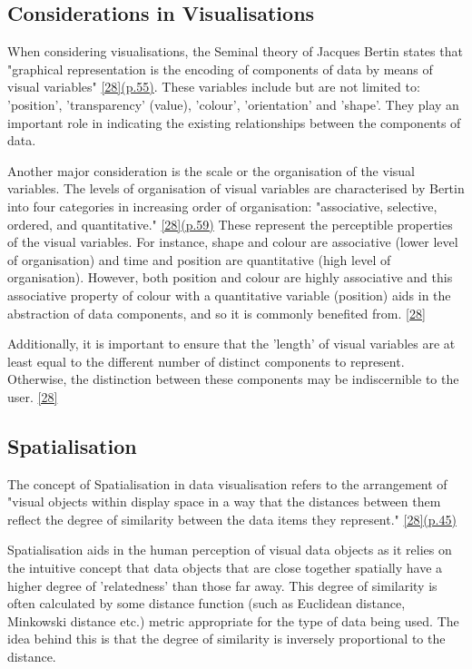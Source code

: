 \subsection{Considerations in Visualisations}
When considering visualisations, the
Seminal theory of Jacques Bertin states that "graphical representation
is the encoding of components of data by means of visual variables" \hyperlink{28}{[28](p.55)}. These variables include but are not limited to: 'position', 'transparency' (value), 'colour', 'orientation' and 'shape'. They play an important role in indicating the existing relationships between the components of data. 


Another major consideration is the scale or the organisation of the visual variables. 
The levels of organisation of visual variables are characterised by Bertin into four categories in increasing order of organisation: "associative, selective, ordered, and quantitative." \hyperlink{28}{[28](p.59)} These represent the perceptible properties of the visual variables. For instance, shape and colour are associative (lower level of organisation) and time and position are quantitative (high level of organisation). However, both position and colour are highly associative and this associative property of colour with a quantitative variable (position) aids in the abstraction of data components, and so it is commonly benefited from. \hyperlink{28}{[28]} 

Additionally, it is important to ensure that the 'length' of visual variables are at least equal to the different number of distinct components to represent. Otherwise, the distinction between these components may be indiscernible to the user. \hyperlink{28}{[28]}


\subsection{Spatialisation}

The concept of Spatialisation in data visualisation refers to the arrangement of "visual objects within display space in a way that the distances between them reflect the degree of similarity between the data items they represent." \hyperlink{28}{[28](p.45)} 

Spatialisation aids in the human perception of visual data objects as it relies on the intuitive concept that data objects that are close together spatially have a higher degree of 'relatedness' than those far away. This degree of similarity is often calculated by some distance function (such as Euclidean distance, Minkowski distance etc.) metric appropriate for the type of data being used. The idea behind this is that the degree of similarity is inversely proportional to the distance. 

